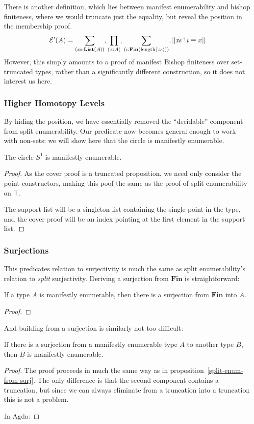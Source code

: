 There is another definition, which lies between manifest enumerability and
bishop finiteness, where we would truncate just the equality, but reveal the
position in the membership proof.
\begin{equation}
  \mathcal{E}'(A) = \sum_{(\mathit{xs} : \mathbf{List}(A))} , \prod_{(x : A)} , \sum_{(i : \textbf{Fin}(\text{length}(\mathit{xs})))} , \lVert \mathit{xs} \mathbin{!} i \equiv x \rVert
\end{equation}
However, this simply amounts to a proof of manifest Bishop finiteness over
set-truncated types, rather than a significantly different construction, so it
does not interest us here.
\subsubsection{Higher Homotopy Levels}
By hiding the position, we have essentially removed the ``decidable'' component
from split enumerability.
Our predicate now becomes general enough to work with non-sets: we will show
here that the circle is manifestly enumerable.
\begin{theorem}
  The circle \(S^1\) is manifestly enumerable.
\end{theorem}
\begin{proof}
  As the cover proof is a truncated proposition, we need only consider the point
  constructors, making this poof the same as the proof of split enumerability on
  \(\top\).

  The support list will be a singleton list containing the single point in the
  type, and the cover proof will be an index pointing at the first element in
  the support list.

\end{proof}
\subsubsection{Surjections}
This predicates relation to surjectivity is much the same as split
enumerability's relation to \emph{split} surjectivity.
Deriving a surjection from \(\mathbf{Fin}\) is straightforward:
\begin{lemma}
  If a type \(A\) is manifestly enumerable, then there is a surjection from
  \(\mathbf{Fin}\) into \(A\).
\end{lemma}
\begin{proof}
\end{proof}
And building from a surjection is similarly not too difficult:
\begin{lemma}
  If there is a surjection from a manifestly enumerable type \(A\) to another
  type \(B\), then \(B\) is manifestly enumerable.
\end{lemma}
\begin{proof}
  The proof proceeds in much the same way as in
  proposition~\ref{split-enum-from-surj}.
  The only difference is that the second component contains a truncation, but
  since we can always eliminate from a truncation into a truncation this is not
  a problem.

  In Agda:
\end{proof}
